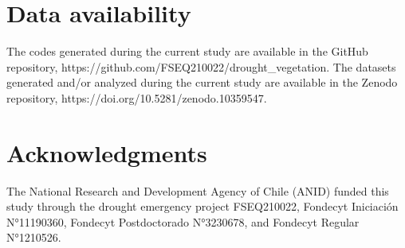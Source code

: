\documentclass[
  sn-nature,
  numbered]{sn-jnl}
\begin{document}
\section{Data availability}\label{data-availability}

The codes generated during the current study are available in the GitHub
repository, https://github.com/FSEQ210022/drought\_vegetation. The
datasets generated and/or analyzed during the current study are
available in the Zenodo repository,
https://doi.org/10.5281/zenodo.10359547.

\section*{Acknowledgments}\label{acknowledgments}

The National Research and Development Agency of Chile (ANID) funded this
study through the drought emergency project FSEQ210022, Fondecyt
Iniciación N°11190360, Fondecyt Postdoctorado N°3230678, and Fondecyt
Regular N°1210526.


  
\end{document}
